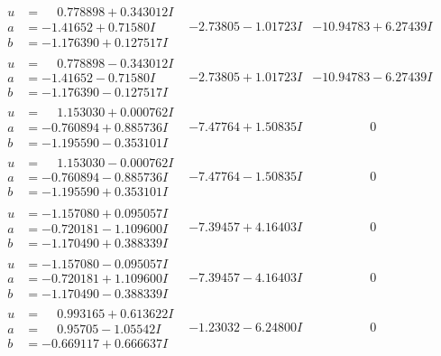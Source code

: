 \documentclass[1p]{elsarticle_modified}
\theoremstyle{definition}
\begin{document}
$$\begin{array}{c|c|c}
\begin{aligned}
u &= \phantom{-}0.778898 + 0.343012 I \\
a &= -1.41652 + 0.71580 I \\
b &= -1.176390 + 0.127517 I\end{aligned}
 & -2.73805 - 1.01723 I & -10.94783 + 6.27439 I \\ \hline\begin{aligned}
u &= \phantom{-}0.778898 - 0.343012 I \\
a &= -1.41652 - 0.71580 I \\
b &= -1.176390 - 0.127517 I\end{aligned}
 & -2.73805 + 1.01723 I & -10.94783 - 6.27439 I \\ \hline\begin{aligned}
u &= \phantom{-}1.153030 + 0.000762 I \\
a &= -0.760894 + 0.885736 I \\
b &= -1.195590 - 0.353101 I\end{aligned}
 & -7.47764 + 1.50835 I & \phantom{-0.000000 } 0 \\ \hline\begin{aligned}
u &= \phantom{-}1.153030 - 0.000762 I \\
a &= -0.760894 - 0.885736 I \\
b &= -1.195590 + 0.353101 I\end{aligned}
 & -7.47764 - 1.50835 I & \phantom{-0.000000 } 0 \\ \hline\begin{aligned}
u &= -1.157080 + 0.095057 I \\
a &= -0.720181 - 1.109600 I \\
b &= -1.170490 + 0.388339 I\end{aligned}
 & -7.39457 + 4.16403 I & \phantom{-0.000000 } 0 \\ \hline\begin{aligned}
u &= -1.157080 - 0.095057 I \\
a &= -0.720181 + 1.109600 I \\
b &= -1.170490 - 0.388339 I\end{aligned}
 & -7.39457 - 4.16403 I & \phantom{-0.000000 } 0 \\ \hline\begin{aligned}
u &= \phantom{-}0.993165 + 0.613622 I \\
a &= \phantom{-}0.95705 - 1.05542 I \\
b &= -0.669117 + 0.666637 I\end{aligned}
 & -1.23032 - 6.24800 I & \phantom{-0.000000 } 0 \\ \hline\begin{aligned}

\end{aligned}
\end{array}$$
\end{document}
